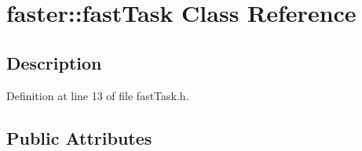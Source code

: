\hypertarget{classfaster_1_1fastTask}{}\section{faster\+:\+:fast\+Task Class Reference}
\label{classfaster_1_1fastTask}


\subsection{Description}


Definition at line 13 of file fast\+Task.\+h.

\subsection*{Public Attributes}
